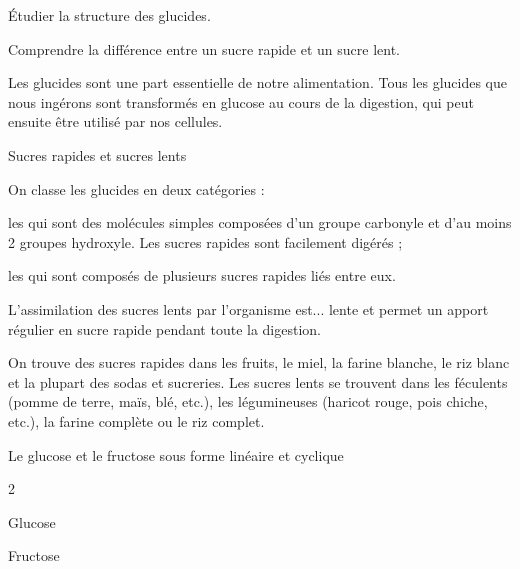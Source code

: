 \tetePremStssBiol
{}

\begin{objectifs}
  \item Étudier la structure des glucides.
  \item Comprendre la différence entre un sucre rapide et un sucre lent.
\end{objectifs}

\begin{contexte}
  Les glucides sont une part essentielle de notre alimentation.
  Tous les glucides que nous ingérons sont transformés en glucose au cours de la digestion,
  qui peut ensuite être utilisé par nos cellules.

\end{contexte}


\begin{doc}{Sucres rapides et sucres lents}
  \begin{importants}
    On classe les glucides en deux catégories :
    \begin{listePoints}
      \item les  qui sont des molécules simples composées d'un groupe carbonyle et d'au moins 2 groupes hydroxyle. Les sucres rapides sont facilement digérés ;
      \item les  qui sont composés de plusieurs sucres rapides liés entre eux.  
    \end{listePoints}
    L'assimilation des sucres lents par l'organisme est... lente et permet un apport régulier en sucre rapide pendant toute la digestion.
  \end{importants}

  On trouve des sucres rapides dans les fruits, le miel, la farine blanche, le riz blanc et la plupart des sodas et sucreries.
  Les sucres lents se trouvent dans les féculents (pomme de terre, maïs, blé, etc.), les légumineuses (haricot rouge, pois chiche, etc.), la farine complète ou le riz complet.
\end{doc}

\begin{doc}{Le glucose et le fructose sous forme linéaire et cyclique}
  \begin{multicols}{2}
  \begin{center}
    \separationBlocs{
      \centering
      \chemfig{[:-90]!\glucoseSemiDev}
    }{
      \centering
      \chemfig{!\glucoseHaw} \\[4pt]
    }
    Glucose

    \separationBlocs{
      \centering
      \chemfig{[:-90] !\fructoseSemiDev} \;
    }{
      \centering
      \chemfig{!\fructoseHaw} \\[4pt]
    }
    Fructose
  \end{center}
  \end{multicols}
\end{doc}


